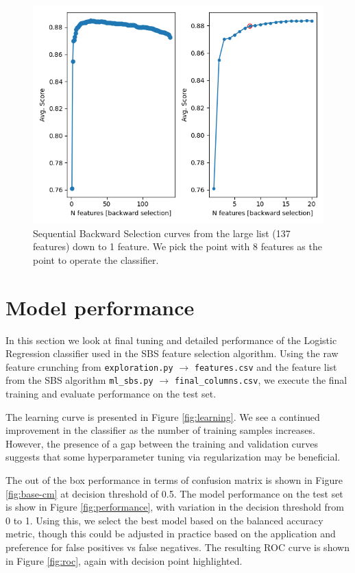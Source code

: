 \documentclass[12pt]{article}
\begin{document}
\begin{figure}
\centering
\includegraphics[width=1\textwidth]{ml_sbs_avg_score_products.png}
\caption{Sequential Backward Selection curves from the large list (137 features) down to 1 feature. We pick the point with 8 features as the point to operate the classifier. }
\label{fig:sbs}
\end{figure}
\section{Model performance}
In this section we look at final tuning and detailed performance of the Logistic Regression classifier used in the SBS feature selection algorithm. Using the raw feature crunching from \verb|exploration.py| $\rightarrow$ \verb|features.csv| and the feature list from the SBS algorithm \verb|ml_sbs.py| $\rightarrow$ \verb|final_columns.csv|, we execute the final training and evaluate performance on the test set. 

The learning curve is presented in Figure \ref{fig:learning}. We see a continued improvement in the classifier as the number of training samples increases. However, the presence of a gap between the training and validation curves suggests that some hyperparameter tuning via regularization may be beneficial. 

The out of the box performance in terms of confusion matrix is shown in Figure \ref{fig:base-cm} at decision threshold of 0.5. The model performance on the test set is show in Figure \ref{fig:performance}, with variation in the decision threshold from 0 to 1. Using this, we select the best model based on the balanced accuracy metric, though this could be adjusted in practice based on the application and preference for false positives vs false negatives. The resulting ROC curve is shown in Figure \ref{fig:roc}, again with decision point highlighted. 
\end{document}
